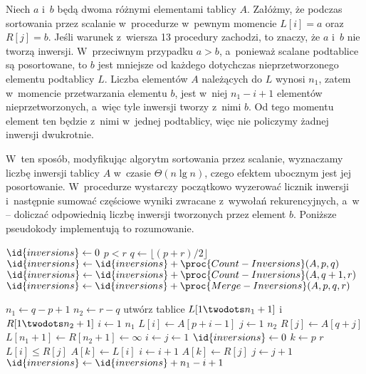 \subproblem %
Niech $a$ i~$b$ będą dwoma różnymi elementami tablicy $A$.
Załóżmy, że podczas sortowania przez scalanie w~procedurze  w~pewnym momencie $L[i]=a$ oraz $R[j]=b$.
Jeśli warunek z~wiersza 13 procedury  zachodzi, to znaczy, że $a$ i~$b$ nie tworzą inwersji.
W~przeciwnym przypadku $a>b$, a~ponieważ scalane podtablice są posortowane, to $b$ jest mniejsze od każdego dotychczas nieprzetworzonego elementu podtablicy $L$.
Liczba elementów $A$ należących do $L$ wynosi $n_1$, zatem w~momencie przetwarzania elementu $b$, jest w~niej $n_1-i+1$ elementów nieprzetworzonych, a~więc tyle inwersji tworzy z~nimi $b$.
Od tego momentu element ten będzie z~nimi w~jednej podtablicy, więc nie policzymy żadnej inwersji dwukrotnie.

W~ten sposób, modyfikując algorytm sortowania przez scalanie, wyznaczamy liczbę inwersji  tablicy $A$ w~czasie $\Theta(n\lg n)$, czego efektem ubocznym jest jej posortowanie.
W~procedurze  wystarczy początkowo wyzerować licznik inwersji i~następnie sumować częściowe wyniki zwracane z~wywołań rekurencyjnych, a~w~ -- doliczać odpowiednią liczbę inwersji tworzonych przez element $b$.
Poniższe pseudokody implementują to rozumowanie.

\begin{codebox}
\li	$\id{inversions}\gets0$
\li	\If $p<r$
\li		\Then
			$q\gets\lfloor(p+r)/2\rfloor$
\li			$\id{inversions}\gets\id{inversions}+\proc{Count-Inversions}(A,p,q)$
\li			$\id{inversions}\gets\id{inversions}+\proc{Count-Inversions}(A,q+1,r)$
\li			$\id{inversions}\gets\id{inversions}+\proc{Merge-Inversions}(A,p,q,r)$
		\End
\li	\Return {}
\end{codebox}

\begin{codebox}
\li	$n_1\gets q-p+1$
\li	$n_2\gets r-q$
\li	utwórz tablice $L[1\twodots n_1+1]$ i~$R[1\twodots n_2+1]$
\li	\For $i\gets1$ \To $n_1$
\li		\Do $L[i]\gets A[p+i-1]$
		\End
\li	\For $j\gets1$ \To $n_2$
\li		\Do $R[j]\gets A[q+j]$
		\End
\li	$L[n_1+1]\gets R[n_2+1]\gets\infty$
\li	$i\gets j\gets1$
\li	$\id{inversions}\gets0$
\li	\For $k\gets p$ \To $r$
\li		\Do
			\If $L[i]\le R[j]$
\li				\Then
					$A[k]\gets L[i]$
\li					$i\gets i+1$
\li				\Else
					$A[k]\gets R[j]$
\li					$j\gets j+1$
\li					$\id{inversions}\gets\id{inversions}+n_1-i+1$
				\End
		\End
\li	\Return {}
\end{codebox}

\endinput
